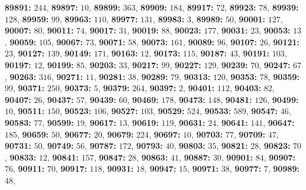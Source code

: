 \textsf{\bfseries 89891:} $244$, \textsf{\bfseries 89897:} $10$, \textsf{\bfseries 89899:} $363$, \textsf{\bfseries 89909:} $184$, \textsf{\bfseries 89917:} $72$, \textsf{\bfseries 89923:} $78$, \textsf{\bfseries 89939:} $128$, \textsf{\bfseries 89959:} $99$, \textsf{\bfseries 89963:} $110$, \textsf{\bfseries 89977:} $131$, \textsf{\bfseries 89983:} $3$, \textsf{\bfseries 89989:} $50$, \textsf{\bfseries 90001:} $127$, \textsf{\bfseries 90007:} $80$, \textsf{\bfseries 90011:} $74$, \textsf{\bfseries 90017:} $31$, \textsf{\bfseries 90019:} $88$, \textsf{\bfseries 90023:} $177$, \textsf{\bfseries 90031:} $23$, \textsf{\bfseries 90053:} $13$, \textsf{\bfseries 90059:} $105$, \textsf{\bfseries 90067:} $73$, \textsf{\bfseries 90071:} $58$, \textsf{\bfseries 90073:} $161$, \textsf{\bfseries 90089:} $96$, \textsf{\bfseries 90107:} $26$, \textsf{\bfseries 90121:} $23$, \textsf{\bfseries 90127:} $139$, \textsf{\bfseries 90149:} $171$, \textsf{\bfseries 90163:} $12$, \textsf{\bfseries 90173:} $115$, \textsf{\bfseries 90187:} $43$, \textsf{\bfseries 90191:} $103$, \textsf{\bfseries 90197:} $12$, \textsf{\bfseries 90199:} $85$, \textsf{\bfseries 90203:} $33$, \textsf{\bfseries 90217:} $99$, \textsf{\bfseries 90227:} $129$, \textsf{\bfseries 90239:} $70$, \textsf{\bfseries 90247:} $67$, \textsf{\bfseries 90263:} $316$, \textsf{\bfseries 90271:} $11$, \textsf{\bfseries 90281:} $38$, \textsf{\bfseries 90289:} $79$, \textsf{\bfseries 90313:} $120$, \textsf{\bfseries 90353:} $78$, \textsf{\bfseries 90359:} $99$, \textsf{\bfseries 90371:} $250$, \textsf{\bfseries 90373:} $5$, \textsf{\bfseries 90379:} $264$, \textsf{\bfseries 90397:} $2$, \textsf{\bfseries 90401:} $112$, \textsf{\bfseries 90403:} $82$, \textsf{\bfseries 90407:} $26$, \textsf{\bfseries 90437:} $57$, \textsf{\bfseries 90439:} $60$, \textsf{\bfseries 90469:} $178$, \textsf{\bfseries 90473:} $148$, \textsf{\bfseries 90481:} $126$, \textsf{\bfseries 90499:} $10$, \textsf{\bfseries 90511:} $150$, \textsf{\bfseries 90523:} $106$, \textsf{\bfseries 90527:} $103$, \textsf{\bfseries 90529:} $524$, \textsf{\bfseries 90533:} $589$, \textsf{\bfseries 90547:} $46$, \textsf{\bfseries 90583:} $77$, \textsf{\bfseries 90599:} $19$, \textsf{\bfseries 90617:} $13$, \textsf{\bfseries 90619:} $119$, \textsf{\bfseries 90631:} $24$, \textsf{\bfseries 90641:} $141$, \textsf{\bfseries 90647:} $185$, \textsf{\bfseries 90659:} $50$, \textsf{\bfseries 90677:} $20$, \textsf{\bfseries 90679:} $224$, \textsf{\bfseries 90697:} $10$, \textsf{\bfseries 90703:} $77$, \textsf{\bfseries 90709:} $47$, \textsf{\bfseries 90731:} $50$, \textsf{\bfseries 90749:} $56$, \textsf{\bfseries 90787:} $172$, \textsf{\bfseries 90793:} $40$, \textsf{\bfseries 90803:} $35$, \textsf{\bfseries 90821:} $28$, \textsf{\bfseries 90823:} $70$, \textsf{\bfseries 90833:} $12$, \textsf{\bfseries 90841:} $157$, \textsf{\bfseries 90847:} $28$, \textsf{\bfseries 90863:} $41$, \textsf{\bfseries 90887:} $30$, \textsf{\bfseries 90901:} $84$, \textsf{\bfseries 90907:} $76$, \textsf{\bfseries 90911:} $70$, \textsf{\bfseries 90917:} $118$, \textsf{\bfseries 90931:} $18$, \textsf{\bfseries 90947:} $15$, \textsf{\bfseries 90971:} $38$, \textsf{\bfseries 90977:} $7$, \textsf{\bfseries 90989:} $48$, 
